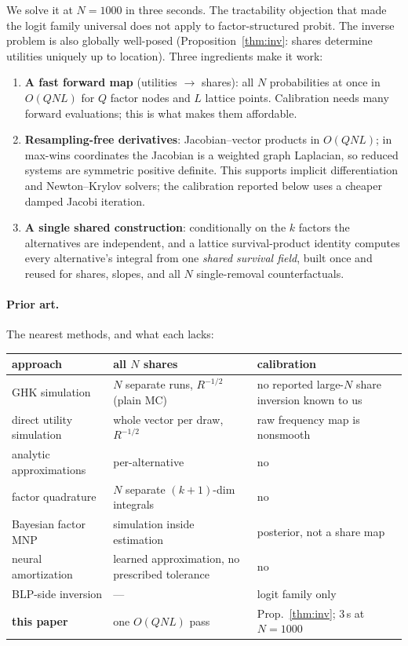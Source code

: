 \documentclass[12pt]{article}
\theoremstyle{remark}
\begin{document}
We solve it at $N = 1000$
in three seconds. The tractability objection that made the logit family
universal does not apply to factor-structured probit. The inverse
problem is also globally well-posed
(Proposition~\ref{thm:inv}: shares determine utilities uniquely up to
location). Three ingredients make it work:

\begin{enumerate}
\item \textbf{A fast forward map} (utilities $\to$ shares): all $N$
probabilities at once in $O(QNL)$ for $Q$ factor nodes and $L$ lattice
points. Calibration needs many forward evaluations; this is what makes
them affordable.
\item \textbf{Resampling-free derivatives}: Jacobian--vector products in
$O(QNL)$; in max-wins coordinates the Jacobian is a weighted graph
Laplacian, so reduced systems are symmetric positive definite. This supports
implicit differentiation and Newton--Krylov solvers; the calibration
reported below uses a cheaper damped Jacobi iteration.
\item \textbf{A single shared construction}: conditionally on the $k$
factors the alternatives are independent, and a lattice survival-product
identity computes every alternative's integral from one \emph{shared
survival field}, built once and reused for shares, slopes, and all $N$
single-removal counterfactuals.
\end{enumerate}

\paragraph{Prior art.} The nearest methods, and what each lacks:

\begin{center}
\footnotesize
\setlength{\tabcolsep}{4pt}
\begin{tabular}{p{4.4cm} p{4.4cm} p{4.6cm}}
\toprule
approach & all $N$ shares & calibration \\
\midrule
GHK simulation \citep{geweke1994,hajivassiliou1998} & $N$ separate runs, $R^{-1/2}$ (plain MC) & no reported large-$N$ share inversion known to us \\
direct utility simulation & whole vector per draw, $R^{-1/2}$ & raw frequency map is nonsmooth \\
analytic approximations \citep{bhat2011,connors2014} & per-alternative & no \\
factor quadrature \citep{butler1982,elrod1995} & $N$ separate $(k{+}1)$-dim integrals & no \\
Bayesian factor MNP \citep{loaiza2022} & simulation inside estimation & posterior, not a share map \\
neural amortization \citep{huch2026} & learned approximation, no prescribed tolerance & no \\
BLP-side inversion \citep{berry1995,conlon2020} & --- & logit family only \\
\textbf{this paper} & one $O(QNL)$ pass & Prop.~\ref{thm:inv}; 3\,s at $N{=}1000$ \\
\bottomrule
\end{tabular}
\end{center}
\end{document}

